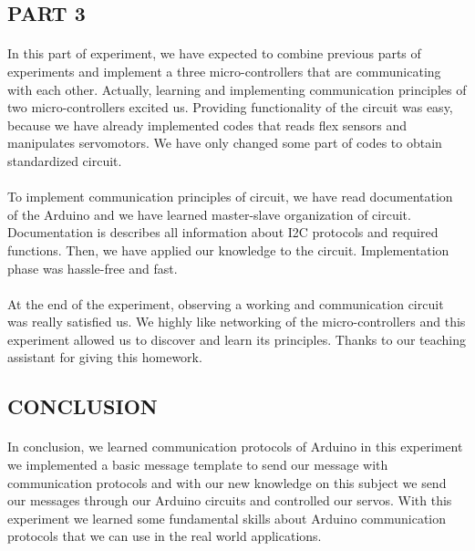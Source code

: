\documentclass[pdftex,12pt,a4paper]{article}
\begin{document}
\begin{flushleft}
\subsection{PART 3}
\paragraph{}
In this part of experiment, we have expected to combine previous parts of experiments and implement a three micro-controllers that are communicating with each other. Actually, learning and implementing communication principles of two micro-controllers excited us. Providing functionality of the circuit was easy, because we have already implemented codes that reads flex sensors and manipulates servomotors. We have only changed some part of codes to obtain standardized circuit. 
\paragraph{}
To implement communication principles of circuit, we have read documentation of the Arduino and we have learned master-slave organization of circuit. Documentation is describes all information about I2C protocols and required functions. Then, we have applied our knowledge to the circuit. Implementation phase was hassle-free and fast.
\paragraph{}
At the end of the experiment, observing a working and communication circuit was really satisfied us. We highly like networking of the micro-controllers and this experiment allowed us to discover and learn its principles. Thanks to our teaching assistant for giving this homework.
\end{flushleft}



\begin{flushleft}
\section{CONCLUSION}
\paragraph{}
In conclusion, we learned communication protocols of Arduino in this experiment we implemented a basic message template to send our message with communication protocols and with our new knowledge on this subject we send our messages through our Arduino circuits and controlled our servos. With this experiment we learned some fundamental skills about Arduino communication protocols that we can use in the real world applications.

\end{flushleft}
\newpage
\nocite{*}
\begin{flushleft}




\end{flushleft}
\end{document}
